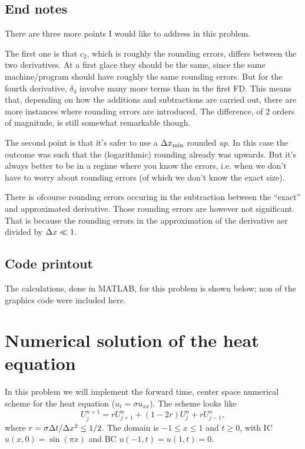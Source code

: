 \documentclass[11pt,letter, swedish, english
]{article}
\begin{document}
\subsection*{End notes}
There are three more points I would like to address in this problem.

The first one is that $c_2$, which is roughly the rounding errors,
differs between the two derivatives. At a first glace they should be
the same, since the same machine/program should have roughly the same
rounding errors. But for the fourth derivative, $\delta_4$ involve
many more terms than in the first FD. This means that, depending on
how the additions and subtractions are carried out, there are more
instances where rounding errors are introduced. The difference, of 2
orders of magnitude, is still somewhat remarkable though. 

The second point is that it's safer to use a $\Delta{x}_\text{min}$ rounded
\emph{up}. In this case the outcome was such that the (logarithmic)
rounding already was upwards. But it's always better to be in a
regime where you know the errors, i.e. when we don't have to worry
about rounding errors (of which we don't know the exact size).

There is ofcourse rounding errors occuring in the subtraction between
the ``exact'' and approximated derivative. Those rounding errors are
however not significant. That is because the rounding errors in the
approximation of the derivative aer divided by $\Delta{x}\ll1$.

\subsection*{Code printout}
The calculations, done in MATLAB, for this problem is shown below; non
of the graphics code were included here.





\section{Numerical solution of the heat equation}
In this problem we will implement the forward time, center space
numerical scheme for the heat equation ($u_t=\sigma u_{xx}$). The scheme looks like
\begin{equation}\label{eq:4_start}
U_j^{n+1}=rU_{j+1}^n+(1-2r)U_j^n+rU_{j-1}^n,
\end{equation}
where $r=\sigma\Delta{t}/\Delta{x}^2\le1/2$. The domain is $-1\le x\le1$ and
$t\ge0$, with IC $u(x,0)=\sin(\pi x)$ and BC $u(-1,t)=u(1,t)=0$.
\end{document}
